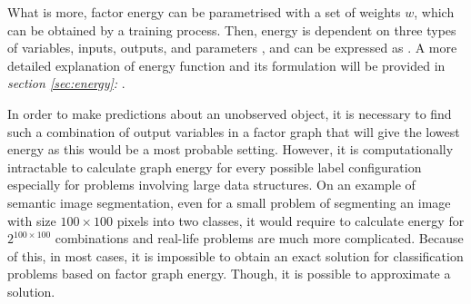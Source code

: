 What is more, factor energy can be parametrised with a set of weights $w$, which can be obtained by a training process. Then, energy is dependent on three types of variables, inputs, outputs, and parameters \cite{inference_crf}, and can be expressed as . A more detailed explanation of energy function and its formulation will be provided in \textit{section \ref{sec:energy}: }.

In order to make predictions about an unobserved object, it is necessary to find such a combination of output variables in a factor graph that will give the lowest energy as this would be a most probable setting. However, it is computationally intractable to calculate graph energy for every possible label configuration especially for problems involving large data structures. On an example of semantic image segmentation, even for a small problem of segmenting an image with size $100\times100$ pixels into two classes, it would require to calculate energy for $2^{100\times100}$ combinations and real-life problems are much more complicated. Because of this, in most cases, it is impossible to obtain an exact solution for classification problems based on factor graph energy. Though, it is possible to approximate a solution.